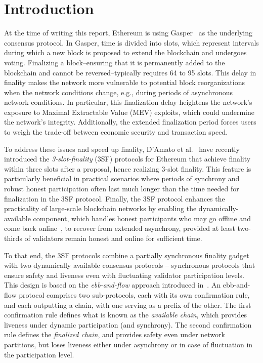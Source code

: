 
\section{Introduction}

At the time of writing this report, Ethereum is using
Gasper~\cite{buterin2020combining} as the underlying consensus protocol.
In Gasper, time is divided into slots, which represent intervals during which a new block is proposed to extend the blockchain and undergoes voting. 
Finalizing a block--ensuring that it is permanently added to the blockchain and cannot be reversed--typically requires 64 to 95 slots.
This delay in finality makes the network more vulnerable to potential
block reorganizations when the network conditions change, 
e.g., during periods of asynchronous network conditions.
In particular, this finalization delay heightens the network’s exposure to
Maximal Extractable Value (MEV) exploits, 
which could undermine the network’s integrity.
Additionally, the extended finalization period forces users to weigh the
trade-off between economic security and transaction speed.

To address these issues and speed up finality, D’Amato et al.~\cite{d20243} have recently introduced the \emph{3-slot-finality} (3SF) protocols 
for Ethereum that achieve finality within three slots after a proposal, hence realizing 3-slot finality.
This feature is particularly beneficial in practical scenarios where periods of synchrony and robust honest participation often 
last much longer than the time needed for finalization in the 3SF protocol.
Finally, the 3SF protocol enhances the practicality of large-scale blockchain networks by enabling the dynamically-available component, 
which handles honest participants who may go offline and come back online~\cite{pass2017sleepy}, 
to recover from extended asynchrony, provided at least two-thirds of validators remain honest and online for sufficient time. 

To that end, the 3SF protocols combine a partially synchronous finality gadget with two dynamically available consensus protocols – 
synchronous protocols that ensure safety and liveness even with fluctuating validator participation levels. 
This design is based on the \emph{ebb-and-flow} approach introduced in~\cite{neu2021ebb}. 
An ebb-and-flow protocol comprises two sub-protocols, each with its own confirmation rule, and each outputting a chain, with one serving 
as a prefix of the other. 
The first confirmation rule defines what is known as the \emph{available chain}, which provides liveness under dynamic participation
(and synchrony). 
The second confirmation rule defines the \emph{finalized chain}, and provides safety even under network partitions, but loses liveness 
either under asynchrony or in case of fluctuation in the participation level.

